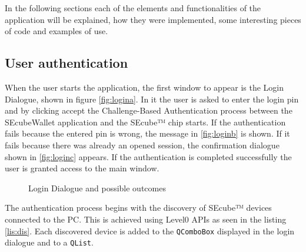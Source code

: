 
In the following sections each of the elements and functionalities of the application will be explained, how they were implemented, some interesting pieces of code and examples of use.

\subsection{User authentication}

When the user starts the application, the first window to appear is the Login Dialogue, shown in figure \ref{fig:logina}. In it the user is asked to enter the login pin and by clicking accept the Challenge-Based Authentication process between the SEcubeWallet application and the SEcube™ chip starts. If the authentication fails because the entered pin is wrong, the message in \ref{fig:loginb} is shown. If it fails because there was already an opened session, the confirmation dialogue shown in \ref{fig:loginc} appears. If the authentication is completed successfully the user is granted access to the main window.

\begin{figure}[ht]
  \centering
  {}
  {}
  \caption{Login Dialogue and possible outcomes}
 \label{fig:login}
\end{figure}

The authentication process begins with the discovery of SEcube™ devices connected to the PC. This is achieved using Level0 APIs as seen in the listing \ref{lis:dis}. Each discovered device is added to the \texttt{QComboBox} displayed in the login dialogue and to a \texttt{QList}.

